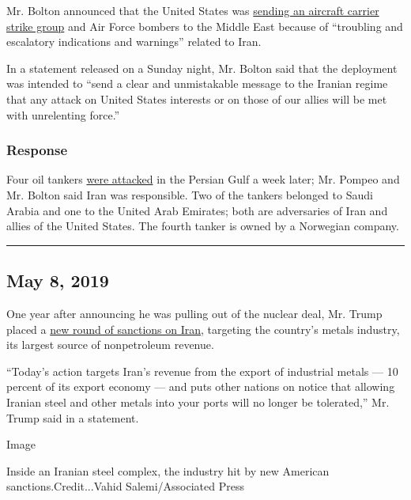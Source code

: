 Mr. Bolton announced that the United States was
\href{https://www.nytimes.com/2019/05/05/world/middleeast/us-iran-military-threat-.html}{sending
an aircraft carrier strike group} and Air Force bombers to the Middle
East because of ``troubling and escalatory indications and warnings''
related to Iran.

In a statement released on a Sunday night, Mr. Bolton said that the
deployment was intended to ``send a clear and unmistakable message to
the Iranian regime that any attack on United States interests or on
those of our allies will be met with unrelenting force.''

\hypertarget{response-2}{%
\subsubsection{Response}\label{response-2}}

Four oil tankers
\href{https://www.nytimes.com/2019/05/13/world/middleeast/saudi-arabia-oil-tanker-sabotage.html}{were
attacked} in the Persian Gulf a week later; Mr. Pompeo and Mr. Bolton
said Iran was responsible. Two of the tankers belonged to Saudi Arabia
and one to the United Arab Emirates; both are adversaries of Iran and
allies of the United States. The fourth tanker is owned by a Norwegian
company.

\begin{center}\rule{0.5\linewidth}{\linethickness}\end{center}

\hypertarget{may-8-2019}{%
\subsection{May 8, 2019}\label{may-8-2019}}

One year after announcing he was pulling out of the nuclear deal, Mr.
Trump placed a
\href{https://www.nytimes.com/2019/05/08/us/politics/iran-nuclear-deal.html}{new
round of sanctions on Iran}, targeting the country's metals industry,
its largest source of nonpetroleum revenue.

``Today's action targets Iran's revenue from the export of industrial
metals --- 10 percent of its export economy --- and puts other nations
on notice that allowing Iranian steel and other metals into your ports
will no longer be tolerated,'' Mr. Trump said in a statement.

Image

Inside an Iranian steel complex, the industry hit by new American
sanctions.Credit...Vahid Salemi/Associated Press

